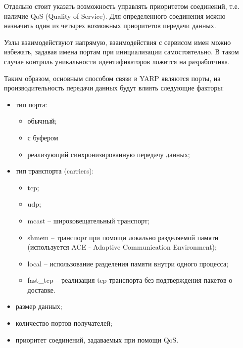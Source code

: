 Отдельно стоит указать возможность управлять приоритетом соединений, т.е. наличие QoS (Quality of Service). Для определенного соединения можно назначить один из четырех возможных приоритетов передачи данных.

Узлы взаимодействуют напрямую, взаимодействия с сервисом имен можно избежать, задавая имена портам при инициализации самостоятельно. В таком случае контроль уникальности идентификаторов ложится на разработчика.

Таким образом, основным способом связи в YARP являются порты, на производительность передачи данных будут влиять следующие факторы:
\begin{itemize}[noitemsep]
	\item тип порта:
	\begin{itemize}[noitemsep]
		\item обычный;
		\item с буфером
		\item реализующий синхронизированную передачу данных;
	\end{itemize}
	\item тип транспорта (carriers):
	\begin{itemize}[noitemsep]
		\item tcp;
		\item udp;
		\item mcast -- широковещательный транспорт;
		\item shmem -- транспорт при помощи локально разделяемой памяти (используется ACE - Adaptive Communication Environment);
		\item local -- использование разделения памяти внутри одного процесса;
		\item fast\_tcp -- реализация tcp транспорта без подтверждения пакетов о доставке.
	\end{itemize}
	\item размер данных;
	\item количество портов-получателей;
	\item приоритет соединений, задаваемых при помощи QoS.
\end{itemize}